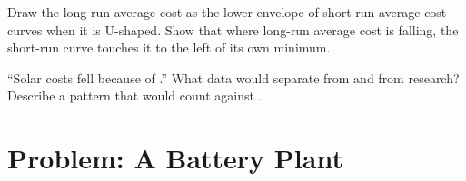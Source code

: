 \begin{exercise}[$\star\star\star$]\label{exo:b1:cost-minimisation:u-shape}
Draw the long-run average cost as the lower envelope of short-run
average cost curves when it is U-shaped. Show that where long-run average
cost is falling, the short-run curve touches it to the left of its own
minimum.
\end{exercise}

\begin{exercise}[$\star\star\star$]\label{exo:b1:cost-minimisation:separate}
``Solar costs fell because of .'' What data would separate
 from  and from research? Describe a
pattern that would count against .
\end{exercise}

\section{Problem: A Battery Plant}\label{sec:b1:cost-minimisation:problem}

